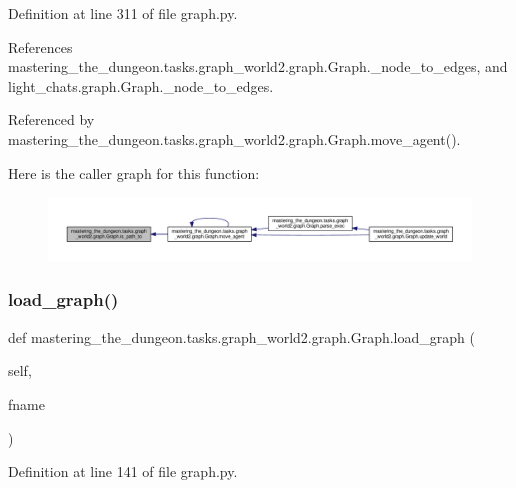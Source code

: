 Definition at line 311 of file graph.\+py.



References mastering\+\_\+the\+\_\+dungeon.\+tasks.\+graph\+\_\+world2.\+graph.\+Graph.\+\_\+node\+\_\+to\+\_\+edges, and light\+\_\+chats.\+graph.\+Graph.\+\_\+node\+\_\+to\+\_\+edges.



Referenced by mastering\+\_\+the\+\_\+dungeon.\+tasks.\+graph\+\_\+world2.\+graph.\+Graph.\+move\+\_\+agent().

Here is the caller graph for this function\+:
\nopagebreak
\begin{figure}[H]
\begin{center}
\leavevmode
\includegraphics[width=350pt]{classmastering__the__dungeon_1_1tasks_1_1graph__world2_1_1graph_1_1Graph_a13eacdd0c2f6a903a63386016d165344_icgraph}
\end{center}
\end{figure}
\mbox{\label{classmastering__the__dungeon_1_1tasks_1_1graph__world2_1_1graph_1_1Graph_a99a3f4950b15400d0cc3d588302b8f84}} 
\subsubsection{\texorpdfstring{load\+\_\+graph()}{load\_graph()}}
{\footnotesize\ttfamily def mastering\+\_\+the\+\_\+dungeon.\+tasks.\+graph\+\_\+world2.\+graph.\+Graph.\+load\+\_\+graph (\begin{DoxyParamCaption}\item[{}]{self,  }\item[{}]{fname }\end{DoxyParamCaption})}



Definition at line 141 of file graph.\+py.



